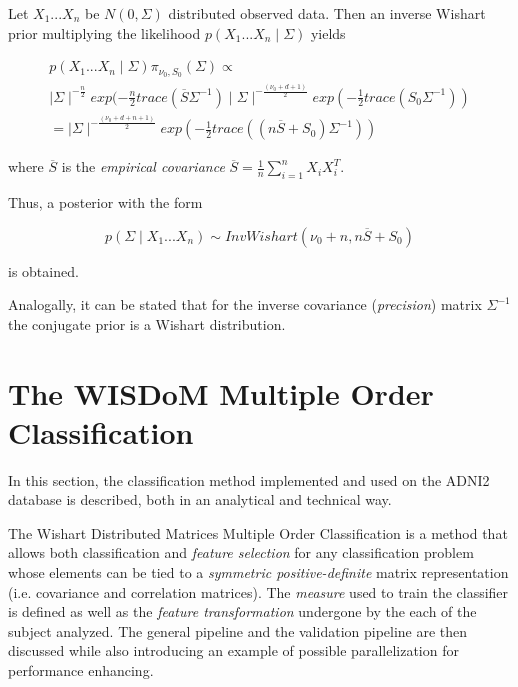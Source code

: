 \documentclass[12pt,openright,twoside,a4paper]{book}
\begin{document}
Let $X_1...X_n$ be $N(0,\Sigma)$ distributed observed data. Then an inverse Wishart prior multiplying the likelihood $p(X_1...X_n\mid \Sigma)$ yields

\begin{equation}
\begin{aligned}
p(X_1...X_n\mid \Sigma)\pi_{\nu_0, S_0}(\Sigma)\propto \\[10pt]
 \mid\Sigma \mid ^{-\frac{n}{2}}exp(-\frac{n}{2}trace(\overline{S} \Sigma^{-1}) \mid \Sigma\mid ^{-\frac{(\nu_0+d+1)}{2}}exp(-\frac{1}{2}trace(S_0\Sigma^{-1})) \\[10pt]  
=  \mid \Sigma\mid ^{-\frac{(\nu_0+d+n+1)}{2}}exp(-\frac{1}{2}trace((n\overline{S}+S_0)\Sigma^{-1}))
\end{aligned}
\end{equation}

where $\overline{S}$ is the \textit{empirical covariance} $\overline{S}=\frac{1}{n}\sum_{i=1}
^nX_iX_i^T$.

Thus, a posterior with the form

\begin{equation}
p(\Sigma\mid X_1...X_n)\sim InvWishart(\nu_0+n, n\overline{S}+S_0)
\end{equation}

is obtained.

Analogally, it can be stated that for the inverse covariance (\textit{precision}) matrix $\Sigma^{-1}$ the conjugate prior is a Wishart distribution.

\chapter{The WISDoM Multiple Order Classification}

In this section, the classification method implemented and used on the ADNI2  database is described, both in an analytical and technical way.

The Wishart Distributed Matrices Multiple Order Classification is a method that allows both classification and \textit{feature selection} for any classification problem whose elements can be tied to a \textit{symmetric positive-definite} matrix representation (i.e. covariance and correlation matrices).
The \textit{measure} used to train the classifier is defined as well as the \textit{feature transformation} undergone by the each of the subject analyzed.
The general pipeline and the validation pipeline are then discussed while also introducing an example of possible parallelization for performance enhancing.
\end{document}
